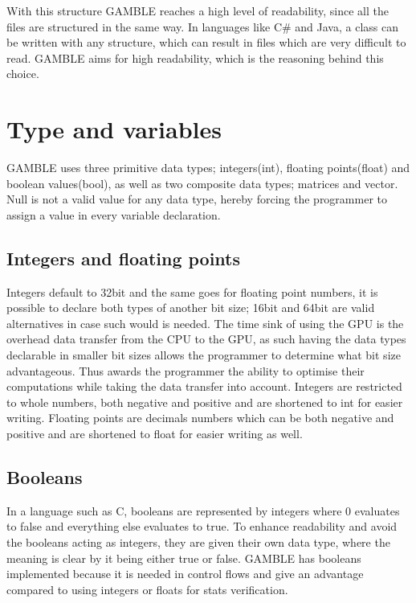 With this structure GAMBLE reaches a high level of readability, since all the files are structured in the same way.
In languages like C\# and Java, a class can be written with any structure, which can result in files which are very difficult to read.
GAMBLE aims for high readability, which is the reasoning behind this choice.

\section{Type and variables}
GAMBLE uses three primitive data types; integers(int), floating points(float) and boolean values(bool), as well as two composite data types; matrices and vector. 
Null is not a valid value for any data type, hereby forcing the programmer to assign a value in every variable declaration.

\subsection{Integers and floating points}
Integers default to 32bit and the same goes for floating point numbers, it is possible to declare both types of another bit size; 16bit and 64bit are valid alternatives in case such would is needed.
The time sink of using the GPU is the overhead data transfer from the CPU to the GPU, as such having the data types declarable in smaller bit sizes allows the programmer to determine what bit size advantageous.
Thus awards the programmer the ability to optimise their computations while taking the data transfer into account.
Integers are restricted to whole numbers, both negative and positive and are shortened to int for easier writing.
Floating points are decimals numbers which can be both negative and positive and are shortened to float for easier writing as well.

\subsection{Booleans}
In a language such as C, booleans are represented by integers where 0 evaluates to false and everything else evaluates to true.
To enhance readability and avoid the booleans acting as integers, they are given their own data type, where the meaning is clear by it being either true or false.
GAMBLE has booleans implemented because it is needed in control flows and give an advantage compared to using integers or floats for stats verification.   

